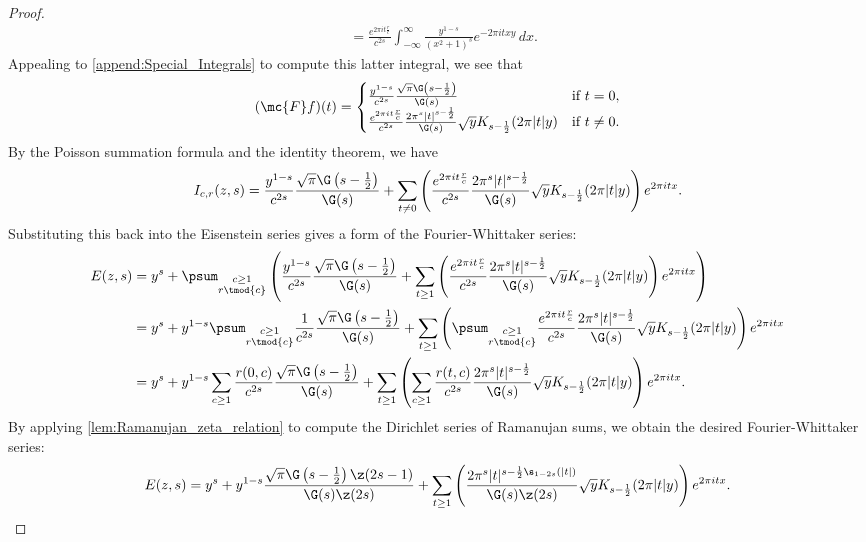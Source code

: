 \begin{proof}
\begin{align*}
          &= \frac{e^{2\pi it\frac{r}{c}}}{c^{2s}}\int_{-\infty}^{\infty}\frac{y^{1-s}}{(x^{2}+1)^{s}}e^{-2\pi itxy}\,dx.
        \end{align*}
        Appealing to \cref{append:Special_Integrals} to compute this latter integral, we see that
        \[
          (\mc{F}f)(t) = \begin{cases} \frac{y^{1-s}}{c^{2s}}\frac{\sqrt{\pi}\G\left(s-\frac{1}{2}\right)}{\G(s)} & \text{if $t = 0$}, \\ \frac{e^{2\pi it\frac{r}{c}}}{c^{2s}}\frac{2\pi^{s}|t|^{s-\frac{1}{2}}}{\G(s)}\sqrt{y}K_{s-\frac{1}{2}}(2\pi|t|y) & \text{if $t \neq 0$}. \end{cases}
        \]
        By the Poisson summation formula and the identity theorem, we have
        \[
          I_{c,r}(z,s) = \frac{y^{1-s}}{c^{2s}}\frac{\sqrt{\pi}\G\left(s-\frac{1}{2}\right)}{\G(s)}+\sum_{t \neq 0}\left(\frac{e^{2\pi it\frac{r}{c}}}{c^{2s}}\frac{2\pi^{s}|t|^{s-\frac{1}{2}}}{\G(s)}\sqrt{y}K_{s-\frac{1}{2}}(2\pi|t|y)\right)e^{2\pi itx}.
        \]
        Substituting this back into the Eisenstein series gives a form of the Fourier-Whittaker series:
      \begin{align*}
        E(z,s) &= y^{s}+\psum_{\substack{c \ge 1 \\ r \tmod{c}}}\left(\frac{y^{1-s}}{c^{2s}}\frac{\sqrt{\pi}\G\left(s-\frac{1}{2}\right)}{\G(s)}+\sum_{t \ge 1}\left(\frac{e^{2\pi it\frac{r}{c}}}{c^{2s}}\frac{2\pi^{s}|t|^{s-\frac{1}{2}}}{\G(s)}\sqrt{y}K_{s-\frac{1}{2}}(2\pi|t|y)\right)e^{2\pi itx}\right) \\
        &= y^{s}+y^{1-s}\psum_{\substack{c \ge 1 \\ r \tmod{c}}}\frac{1}{c^{2s}}\frac{\sqrt{\pi}\G\left(s-\frac{1}{2}\right)}{\G(s)}+\sum_{t \ge 1}\left(\psum_{\substack{c \ge 1 \\ r \tmod{c}}}\frac{e^{2\pi it\frac{r}{c}}}{c^{2s}}\frac{2\pi^{s}|t|^{s-\frac{1}{2}}}{\G(s)}\sqrt{y}K_{s-\frac{1}{2}}(2\pi|t|y)\right)e^{2\pi itx} \\
        &= y^{s}+y^{1-s}\sum_{c \ge 1}\frac{r(0,c)}{c^{2s}}\frac{\sqrt{\pi}\G\left(s-\frac{1}{2}\right)}{\G(s)}+\sum_{t \ge 1}\left(\sum_{c \ge 1}\frac{r(t,c)}{c^{2s}}\frac{2\pi^{s}|t|^{s-\frac{1}{2}}}{\G(s)}\sqrt{y}K_{s-\frac{1}{2}}(2\pi|t|y)\right)e^{2\pi itx}.
      \end{align*}
      By applying \cref{lem:Ramanujan_zeta_relation} to compute the Dirichlet series of Ramanujan sums, we obtain the desired Fourier-Whittaker series:
      \[
        E(z,s) = y^{s}+y^{1-s}\frac{\sqrt{\pi}\G\left(s-\frac{1}{2}\right)\z(2s-1)}{\G(s)\z(2s)}+\sum_{t \ge 1}\left(\frac{2\pi^{s}|t|^{s-\frac{1}{2}\s_{1-2s}(|t|)}}{\G(s)\z(2s)}\sqrt{y}K_{s-\frac{1}{2}}(2\pi|t|y)\right)e^{2\pi itx}.
      \]
      \end{proof}

